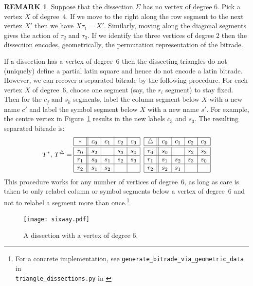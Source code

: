 \documentclass[12pt,amstags,fleqn]{article}
\theoremstyle{plain}
\theoremstyle{definition}
\theoremstyle{definition}
\newtheorem{remark}[theorem]{REMARK}
\begin{document}
\begin{remark}
Suppose that the dissection $\Sigma$ has no vertex of degree $6$.
Pick a vertex $X$ of degree~$4$. If we
move to the right along the row segment to the next vertex $X'$ then we
have $X \tau_1 = X'$. Similarly, moving along the diagonal segments
gives the action of $\tau_2$ and $\tau_3$. If we identify the three vertices of degree $2$
then the dissection encodes, geometrically,
the permutation representation of the bitrade.

If a dissection has a vertex of degree~$6$ then the dissecting triangles
do not (uniquely) define a partial latin square and hence do not encode
a latin bitrade. However, we can recover a separated
bitrade by the following procedure. For each vertex $X$ of degree~$6$,
choose one segment (say, the $r_i$ segment) to stay fixed. Then for the $c_j$
and $s_k$ segments, label the column segment below $X$ with a new name $c'$
and label the symbol segment below $X$ with a new name $s'$. For example,
the centre vertex in Figure~\ref{figsixway} results in the new labels
$c_3$ and $s_3$. The resulting separated bitrade is:
\[ T^{\ast},\, T^{\triangle} =\begin{array}{|c||c|c|c|c|}
\hline \ast & c_0 & c_1 & c_2 & c_3\\
\hline \hline r_0 & s_2 & ~ & s_3 & s_0\\\hline r_1 & s_0 & s_1 & s_2 & s_3\\\hline r_2 & s_1 & s_2 & ~ & ~\\\hline\end{array}\phantom{x}\begin{array}{|c||c|c|c|c|}
\hline \triangle & c_0 & c_1 & c_2 & c_3\\
\hline \hline r_0 & s_0 & ~ & s_2 & s_3\\\hline r_1 & s_1 & s_2 & s_3 & s_0\\\hline r_2 & s_2 & s_1 & ~ & ~\\\hline\end{array}\]
This procedure works for any number of vertices of degree~$6$, as long
as care is taken to only relabel column or symbol segments below a
vertex of degree~$6$ and not to relabel a segment more than
once.\footnote{For a concrete implementation, see 
\texttt{generate\_bitrade\_via\_geometric\_data} in\\
\texttt{triangle\_dissections.py} in \cite{dissections}}
\end{remark}
\begin{figure}[hbt]
\begin{center}
\texttt{[image: sixway.pdf]}
\end{center}
\caption{A dissection with a vertex of degree $6$.}
\label{figsixway}
\end{figure}
\end{document}
